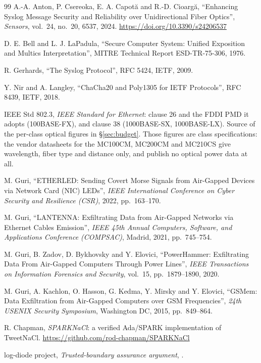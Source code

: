 \documentclass[11pt,a4paper]{article}
\begin{document}
\begin{thebibliography}{99}
\small
{}
A.-A. Anton, P. Csereoka, E. A. Capot\u{a} and R.-D. Cioarg\u{a},
``Enhancing Syslog Message Security and Reliability over Unidirectional Fiber
Optics'', \emph{Sensors}, vol.~24, no.~20, 6537, 2024.
\url{https://doi.org/10.3390/s24206537}

D. E. Bell and L. J. LaPadula,
``Secure Computer System: Unified Exposition and Multics Interpretation'',
MITRE Technical Report ESD-TR-75-306, 1976.

R. Gerhards, ``The Syslog Protocol'', RFC 5424, IETF, 2009.

Y. Nir and A. Langley, ``ChaCha20 and Poly1305 for IETF Protocols'',
RFC 8439, IETF, 2018.

IEEE Std 802.3, \emph{IEEE Standard for Ethernet}: clause 26 and the FDDI PMD
it adopts (100BASE-FX), and clause 38 (1000BASE-SX, 1000BASE-LX). Source of
the per-class optical figures in \S\ref{sec:budget}. Those figures are class
specifications: the vendor datasheets for the MC100CM, MC200CM and MC210CS
give wavelength, fiber type and distance only, and publish no optical power
data at all.

M. Guri, ``ETHERLED: Sending Covert Morse Signals from Air-Gapped Devices via
Network Card (NIC) LEDs'', \emph{IEEE International Conference on Cyber
Security and Resilience (CSR)}, 2022, pp.~163--170.

M. Guri, ``LANTENNA: Exfiltrating Data from Air-Gapped Networks via Ethernet
Cables Emission'', \emph{IEEE 45th Annual Computers, Software, and
Applications Conference (COMPSAC)}, Madrid, 2021, pp.~745--754.

M. Guri, B. Zadov, D. Bykhovsky and Y. Elovici, ``PowerHammer: Exfiltrating
Data From Air-Gapped Computers Through Power Lines'', \emph{IEEE Transactions
on Information Forensics and Security}, vol.~15, pp.~1879--1890, 2020.

M. Guri, A. Kachlon, O. Hasson, G. Kedma, Y. Mirsky and Y. Elovici,
``GSMem: Data Exfiltration from Air-Gapped Computers over GSM Frequencies'',
\emph{24th USENIX Security Symposium}, Washington DC, 2015, pp.~849--864.

R. Chapman, \emph{SPARKNaCl}: a verified Ada/SPARK implementation of TweetNaCl.
\url{https://github.com/rod-chapman/SPARKNaCl}

log-diode project, \emph{Trusted-boundary assurance argument},
.
\end{thebibliography}
\end{document}

